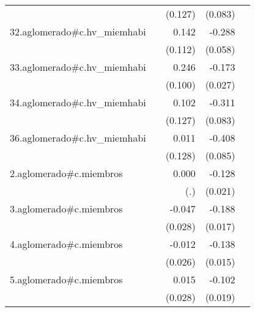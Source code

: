 {\begin{longtable}{l*{4}{D{.}{.}{-1}}}
            &                     &     (0.127)         &     (0.083)         &                     \\
\addlinespace
32.aglomerado#c.hv\_miemhabi&                     &       0.142         &      -0.288\sym{***}&                     \\
            &                     &     (0.112)         &     (0.058)         &                     \\
\addlinespace
33.aglomerado#c.hv\_miemhabi&                     &       0.246\sym{*}  &      -0.173\sym{***}&                     \\
            &                     &     (0.100)         &     (0.027)         &                     \\
\addlinespace
34.aglomerado#c.hv\_miemhabi&                     &       0.102         &      -0.311\sym{***}&                     \\
            &                     &     (0.127)         &     (0.083)         &                     \\
\addlinespace
36.aglomerado#c.hv\_miemhabi&                     &       0.011         &      -0.408\sym{***}&                     \\
            &                     &     (0.128)         &     (0.085)         &                     \\
\addlinespace
2.aglomerado#c.miembros&                     &       0.000         &      -0.128\sym{***}&                     \\
            &                     &         (.)         &     (0.021)         &                     \\
\addlinespace
3.aglomerado#c.miembros&                     &      -0.047         &      -0.188\sym{***}&                     \\
            &                     &     (0.028)         &     (0.017)         &                     \\
\addlinespace
4.aglomerado#c.miembros&                     &      -0.012         &      -0.138\sym{***}&                     \\
            &                     &     (0.026)         &     (0.015)         &                     \\
\addlinespace
5.aglomerado#c.miembros&                     &       0.015         &      -0.102\sym{***}&                     \\
            &                     &     (0.028)         &     (0.019)         &                     \\

\end{longtable}}
